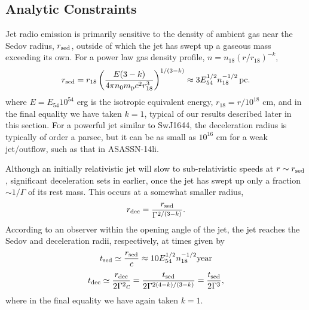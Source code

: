 \documentclass[usenatbib,fleqn]{mnras}
\begin{document}

\subsection{Analytic Constraints}
\label{sec:analy}


Jet radio emission is primarily sensitive to the density of ambient
gas near the Sedov radius, $r_{\rm sed}$, outside of which the jet has
swept up a gaseous mass exceeding its own. For a power law gas density
profile, $n= n_{18} \left(r/r_{18}\right)^{-k}$,
\begin{equation}
  r_{\rm sed} = r_{18} \left( \frac{E(3-k)}{4\pi n_{0}
      m_{\rm p} c^2 r_{18}^3} \right)^{1/(3-k)} \approx 3 E_{54}^{1/2} n_{\rm 18}^{-1/2}\,{\rm pc}. 
  \label{eq:rdec}
\end{equation}
where $E = E_{54}10^{54}$ erg is the isotropic equivalent energy,
$r_{18} = r/10^{18}$ cm, and in the final equality we have taken $k =
1$, typical of our results described later in this section.  For a
powerful jet similar to SwJ1644, the deceleration radius is typically
of order a parsec, but it can be as small as $10^{16}$ cm for a weak
jet/outflow, such as that in ASASSN-14li.

Although an initially relativistic jet will slow to sub-relativistic
speeds at $r \sim r_{\rm sed}$, significant deceleration sets in
earlier, once the jet has swept up only a fraction $\sim 1/\Gamma$ of
its rest mass.  This occurs at a somewhat smaller radius,
\begin{equation}
  r_{\rm dec}=\frac{r_{\rm sed}}{\Gamma^{2/(3-k)}}.
  \label{eq:rdec2}
\end{equation}
According to an observer within the opening angle of the jet, the jet
reaches the Sedov and deceleration radii, respectively, at times given
by
\begin{equation}
t_{\rm sed} \simeq \frac{r_{\rm sed}}{c} \approx
10 E_{54}^{1/2}n_{18}^{-1/2} {\rm year}
 \end{equation} 
\begin{equation}
t_{\rm dec} \simeq
\frac{r_{\rm dec}}{2\Gamma^{2} c} = \frac{t_{\rm
    sed}}{2\Gamma^{2(4-k)/(3-k)}} = \frac{t_{\rm sed}}{2\Gamma^{3}},
 \label{eq:tdec}
\end{equation}
%
where in the final equality we have again taken $k = 1$.
\end{document}
